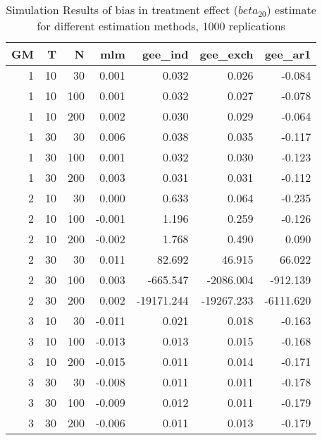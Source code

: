 \begin{table}[ht]
\centering
\begin{tabular}{rrrrrrr}
  \hline
GM & T & N & mlm & gee\_ind & gee\_exch & gee\_ar1 \\ 
  \hline
1 & 10 & 30 & 0.001 & 0.032 & 0.026 & -0.084 \\ 
  1 & 10 & 100 & 0.001 & 0.032 & 0.027 & -0.078 \\ 
  1 & 10 & 200 & 0.002 & 0.030 & 0.029 & -0.064 \\ 
  1 & 30 & 30 & 0.006 & 0.038 & 0.035 & -0.117 \\ 
  1 & 30 & 100 & 0.001 & 0.032 & 0.030 & -0.123 \\ 
  1 & 30 & 200 & 0.003 & 0.031 & 0.031 & -0.112 \\ 
   \hline
2 & 10 & 30 & 0.000 & 0.633 & 0.064 & -0.235 \\ 
  2 & 10 & 100 & -0.001 & 1.196 & 0.259 & -0.126 \\ 
  2 & 10 & 200 & -0.002 & 1.768 & 0.490 & 0.090 \\ 
  2 & 30 & 30 & 0.011 & 82.692 & 46.915 & 66.022 \\ 
  2 & 30 & 100 & 0.003 & -665.547 & -2086.004 & -912.139 \\ 
  2 & 30 & 200 & 0.002 & -19171.244 & -19267.233 & -6111.620 \\ 
   \hline
3 & 10 & 30 & -0.011 & 0.021 & 0.018 & -0.163 \\ 
  3 & 10 & 100 & -0.013 & 0.013 & 0.015 & -0.168 \\ 
  3 & 10 & 200 & -0.015 & 0.011 & 0.014 & -0.171 \\ 
  3 & 30 & 30 & -0.008 & 0.011 & 0.011 & -0.178 \\ 
  3 & 30 & 100 & -0.009 & 0.012 & 0.011 & -0.179 \\ 
  3 & 30 & 200 & -0.006 & 0.011 & 0.013 & -0.179 \\ 
   \hline
\end{tabular}
\caption{Simulation Results of bias in treatment effect ($beta_{20}$) estimate for different estimation methods, 1000 replications} 
\label{tab:sim_results_bias}
\end{table}
